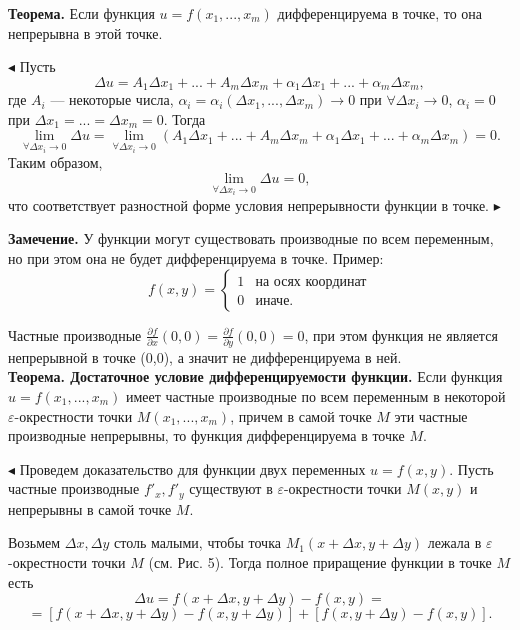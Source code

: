 \documentclass[12pt]{article}
\begin{document}
\textbf{Теорема.} Если функция $u = f(x_1, ..., x_m)$ дифференцируема в точке, то она непрерывна в этой точке.


$\blacktriangleleft$ Пусть
$$
	\Delta u = A_1\Delta x_1 + ... + A_m \Delta x_m + \alpha_1 \Delta x_1 + ... + \alpha_m \Delta x_m,
$$
где $A_i$ --- некоторые числа, $\alpha_i = \alpha_i(\Delta x_1, ..., \Delta x_m) \rightarrow 0$ при $ \forall \Delta x_i \rightarrow 0$, $\alpha_i = 0$ при $\Delta x_1 = ... = \Delta x_m = 0$.
Тогда 
$$
	\lim_{ \forall \Delta x_i \rightarrow 0} \Delta u = \lim_{\forall \Delta x_i \rightarrow 0} (A_1\Delta x_1 + ... + A_m \Delta x_m + \alpha_1 \Delta x_1 + ... + \alpha_m \Delta x_m) = 0.
$$
Таким образом,
$$
\lim_{\forall \Delta x_i \rightarrow 0} \Delta u = 0,
$$
что соответствует разностной форме условия непрерывности функции в точке. $\blacktriangleright$


\textbf{Замечение.} У функции могут существовать производные по всем переменным, но при этом она не будет дифференцируема в точке. Пример:
\begin{equation*}
f(x,y) = 
 \begin{cases}
   1 &\text{на осях координат}\\
   0 &\text{иначе.}
 \end{cases}
\end{equation*}

Частные производные $\frac{\partial f}{\partial x}(0,0) = \frac{\partial f}{\partial y}(0,0) = 0$, при этом функция не является непрерывной в точке (0,0), а значит не дифференцируема в ней. \\

\textbf{Теорема. Достаточное условие дифференцируемости функции.} Если функция $u = f(x_1, ..., x_m)$ имеет частные производные по всем переменным в некоторой $\varepsilon$-окрестности точки $M(x_1, ..., x_m)$, причем в самой точке $M$ эти частные производные непрерывны, то функция дифференцируема в точке $M$.

$\blacktriangleleft$ Проведем доказательство для функции двух переменных $u = f(x,y)$. Пусть частные производные $f'_x, f'_y$ существуют в $\varepsilon$-окрестности точки $M(x,y)$ и непрерывны в самой точке $M$.


Возьмем $\Delta x, \Delta y$ столь малыми, чтобы точка $M_1(x + \Delta x, y + \Delta y)$ лежала в $\varepsilon$-окрестности точки $M$ (см. Рис. 5). Тогда полное приращение функции в точке $M$ есть
$$	
	\Delta u = f(x + \Delta x, y + \Delta y) - f(x,y) = 
$$ 
$$
	= [f(x + \Delta x, y + \Delta y) - f(x, y + \Delta y)] + [f(x, y + \Delta y) - f(x,y)].
$$
\end{document}
